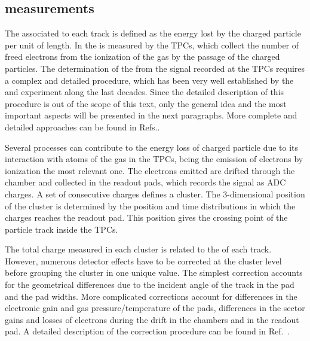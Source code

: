 \subsection{\dedx measurements}


The \dedx associated to each track is defined as the energy lost by the charged
particle per unit of length.
In \NASixtyOne the \dedx is measured by the TPCs, which collect the number of
freed electrons from the ionization of the gas by the passage of the charged particles.
The determination of the \dedx from the signal recorded at the TPCs requires a complex and
detailed procedure, which has been very well established by the \NAFortyNine and \NASixtyOne
experiment along the last decades. Since the detailed description of this procedure
is out of the scope of this text, only the general idea and the most important aspects
will be presented in the next paragraphs. More complete and detailed approaches
can be found in Refs.\cite{GaborVeresThesis}.

Several processes can contribute to the energy loss of charged particle due to
its interaction with atoms of the gas in the TPCs, being the emission of
electrons by ionization the most relevant one. The electrons emitted are
drifted through the chamber and collected in the readout pads, which records
the signal as ADC charges. A set of consecutive charges defines a cluster.
The 3-dimensional position of the cluster is determined by the position
and time distributions in which the charges reaches the readout pad. This
position gives the crossing point of the particle track inside the TPCs.

The total charge measured in each cluster is related to the \dedx of each track.
However, numerous detector effects have to be corrected at the cluster level before
grouping the cluster in one unique \dedx value. The simplest correction accounts for
the geometrical differences due to the incident angle of the track in the pad and
the pad widths. More complicated corrections account for differences in the electronic
gain and gas pressure/temperature of the pads, differences in the sector gains and
losses of electrons during the drift in the chambers and in the readout pad.
A detailed description of the correction procedure can be found in Ref.~\cite{AntoniMThesis}.

